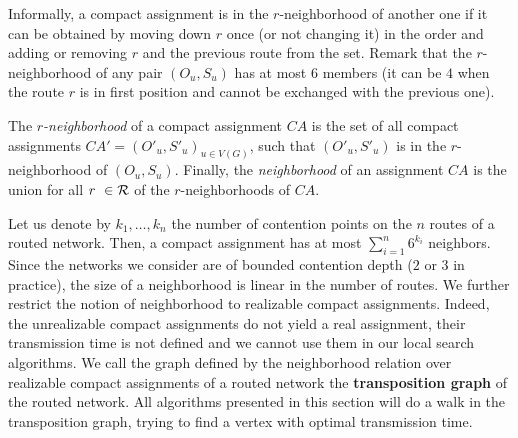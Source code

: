 Informally, a compact assignment is in the $r$-neighborhood of another one if it can be obtained by 
moving down $r$ once (or not changing it) in the order and adding or removing $r$ and the previous route from the set. 
Remark that the $r$-neighborhood of any pair $(O_u,S_u)$ has at most $6$ members (it can be $4$ when the route $r$ is in first position and cannot be exchanged with the previous one). 

The \emph{$r$-neighborhood} of a compact assignment $CA$ is the set of all compact assignments $CA'=(O'_u,S'_u)_{u \in V(G)}$, such that  $(O'_u,S'_u)$ is in the $r$-neighborhood of $(O_u,S_u)$. Finally, the \emph{neighborhood} of an assignment $CA$ is the union for all $r \in {\cal R}$ of the $r$-neighborhoods of $CA$.

 Let us denote by $k_1,\ldots,k_n$ the number of contention points on the $n$ routes of 
 a routed network. Then, a compact assignment has at most $\sum_{i=1}^n 6^{k_i}$ neighbors. Since the networks we consider are of bounded contention depth ($2$ or $3$ in practice), the size of a neighborhood is linear in the number of routes.  We further restrict the notion of neighborhood to realizable compact assignments. Indeed, the unrealizable compact assignments do not yield a real assignment, their transmission time is not defined and we cannot use them in our local search algorithms. We call the graph defined by the neighborhood relation over realizable compact assignments of a routed network the {\bf transposition graph} of the routed network. 
  All algorithms presented in this section will do a walk in the transposition graph, trying to find a vertex with optimal
  transmission time. 

